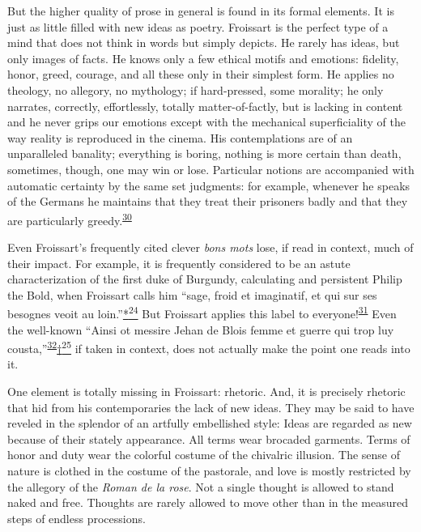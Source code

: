 But the higher quality of prose in general is found in its formal
elements. It is just as little filled with new ideas as poetry.
Froissart
\protect\hypertarget{21_Chapter_Thirteen__IMAGE_AND_WORD.xhtmlux5cux23page_355}{}{}is
the perfect type of a mind that does not think in words but simply
depicts. He rarely has ideas, but only images of facts. He knows only a
few ethical motifs and emotions: fidelity, honor, greed, courage, and
all these only in their simplest form. He applies no theology, no
allegory, no mythology; if hard-pressed, some morality; he only
narrates, correctly, effortlessly, totally matter-of-factly, but is
lacking in content and he never grips our emotions except with the
mechanical superficiality of the way reality is reproduced in the
cinema. His contemplations are of an unparalleled banality; everything
is boring, nothing is more certain than death, sometimes, though, one
may win or lose. Particular notions are accompanied with automatic
certainty by the same set judgments: for example, whenever he speaks of
the Germans he maintains that they treat their prisoners badly and that
they are particularly
greedy.\textsuperscript{\protect\hypertarget{21_Chapter_Thirteen__IMAGE_AND_WORD.xhtmlux5cux23id_250}{\protect\hyperlink{23_NOTES.xhtmlux5cux23id_251}{30}}}

Even Froissart's frequently cited clever \emph{bons mots} lose, if read
in context, much of their impact. For example, it is frequently
considered to be an astute characterization of the first duke of
Burgundy, calculating and persistent Philip the Bold, when Froissart
calls him ``sage, froid et imaginatif, et qui sur ses besognes veoit au
loin.''\protect\hypertarget{21_Chapter_Thirteen__IMAGE_AND_WORD.xhtmlux5cux23id_2741}{\protect\hyperlink{23_NOTES.xhtmlux5cux23id_2742}{*\textsuperscript{24}}}
But Froissart applies this label to
everyone!\textsuperscript{\protect\hypertarget{21_Chapter_Thirteen__IMAGE_AND_WORD.xhtmlux5cux23id_248}{\protect\hyperlink{23_NOTES.xhtmlux5cux23id_249}{31}}}
Even the well-known ``Ainsi ot messire Jehan de Blois femme et guerre
qui trop luy
cousta,''\textsuperscript{\protect\hypertarget{21_Chapter_Thirteen__IMAGE_AND_WORD.xhtmlux5cux23id_246}{\protect\hyperlink{23_NOTES.xhtmlux5cux23id_247}{32}}}\protect\hypertarget{21_Chapter_Thirteen__IMAGE_AND_WORD.xhtmlux5cux23id_2743}{\protect\hyperlink{23_NOTES.xhtmlux5cux23id_2744}{†\textsuperscript{25}}}
if taken in context, does not actually make the point one reads into it.

One element is totally missing in Froissart: rhetoric. And, it is
precisely rhetoric that hid from his contemporaries the lack of new
ideas. They may be said to have reveled in the splendor of an artfully
embellished style: Ideas are regarded as new because of their stately
appearance. All terms wear brocaded garments. Terms of honor and duty
wear the colorful costume of the chivalric illusion. The sense of nature
is clothed in the costume of the pastorale, and love is mostly
restricted by the allegory of the \emph{Roman de la rose}. Not a single
thought is allowed to stand naked and free. Thoughts are rarely allowed
to move other than in the measured steps of endless processions.

